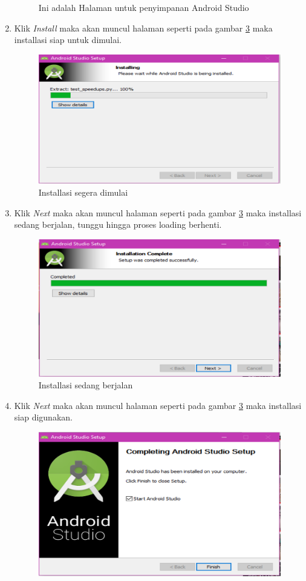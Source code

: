 \begin{enumerate}
\begin{figure}[!htbp]
  		 \caption{Ini adalah Halaman untuk penyimpanan Android Studio}\label{fig:ex}
		 \end{figure}
	\item Klik \textit{Install} maka akan muncul halaman seperti pada gambar \ref{fig:done} maka installasi siap untuk dimulai.
		 \begin{figure}[!htbp]
  		 \centering
 		 \includegraphics[width=.75\textwidth]{figures/In9.png}
  		 \caption{Installasi segera dimulai}\label{fig:done}
		 \end{figure}
		 \item Klik \textit{Next} maka akan muncul halaman seperti pada gambar \ref{fig:done} maka installasi sedang berjalan, tunggu hingga proses loading berhenti.
		 \begin{figure}[!htbp]
  		 \centering
 		 \includegraphics[width=.75\textwidth]{figures/In10.png}
  		 \caption{Installasi sedang berjalan}\label{fig:done}
		 \end{figure}
		 \item Klik \textit{Next} maka akan muncul halaman seperti pada gambar \ref{fig:done} maka installasi siap digunakan.
		 \begin{figure}[!htbp]
  		 \centering
 		 \includegraphics[width=.75\textwidth]{figures/In11.png}

\end{figure}
\end{enumerate}
